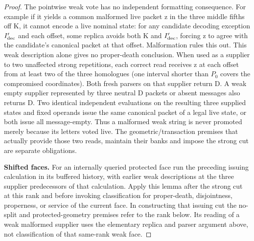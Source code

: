 \begin{proof}
The pointwise weak vote has no independent formatting consequence. For example if it yields a common malformed live packet z in the three middle fifths off K, it cannot encode a live nominal state: for any candidate decoding exception \(I'_{\rm dec}\) and each offset, some replica avoids both K and \(I'_{\rm dec}\), forcing z to agree with the candidate's canonical packet at that offset. Malformation rules this out. This weak description alone gives no proper-death conclusion. When used as a supplier to two unaffected strong repetitions, each correct read receives z at each offset from at least two of the three homologues (one interval shorter than \(P_0\) covers the compromised coordinates). Both fresh parsers on that supplier return D. A weak empty supplier represented by three neutral D packets or absent messages also returns D. Two identical independent evaluations on the resulting three supplied states and fixed operands issue the same canonical packet of a legal live state, or both issue all message-empty. Thus a malformed weak string is never promoted merely because its letters voted live. The geometric/transaction premises that actually provide those two reads, maintain their banks and impose the strong cut are separate obligations.

\textbf{Shifted faces.} For an internally queried protected face run the preceding issuing calculation in its buffered history, with earlier weak descriptions at the three supplier predecessors of that calculation. Apply this lemma after the strong cut at this rank and before invoking classification for proper-death, disjointness, properness, or service of the current face. In constructing that issuing cut the no-split and protected-geometry premises refer to the rank below. Its reading of a weak malformed supplier uses the elementary replica and parser argument above, not classification of that same-rank weak face.
\end{proof}

